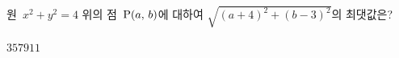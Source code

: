 원~$x^2+y^2=4$ 위의 점~$\mathrm{P}(a,\,b)$에 대하여 $\sqrt{(a+4)^2+(b-3)^2}$의 최댓값은?
\begin{choices32}{$3$}{$5$}{$7$}{$9$}{$11$}\end{choices32}
